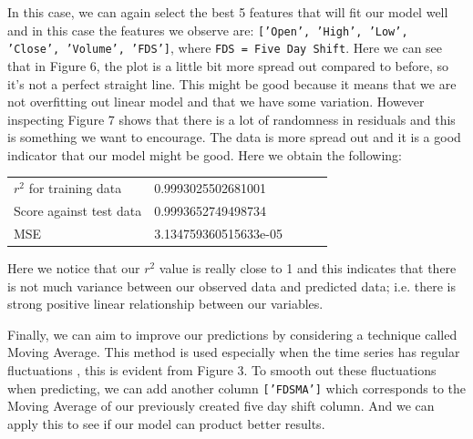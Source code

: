 \documentclass[11pt]{report}
\begin{document}
\vspace{0.3cm}
\noindent
In this case, we can again select the best 5 features that will fit our model well and in this case the features we observe are: \texttt{['Open', 'High', 'Low', 'Close', 'Volume', 'FDS']}, where \texttt{FDS = Five Day Shift}. Here we can see that in Figure 6, the plot is a little bit more spread out compared to before, so it's not a perfect straight line. This might be good because it means that we are not overfitting out linear model and that we have some variation. However inspecting Figure 7 shows that there is a lot of randomness in residuals and this is something we want to encourage. The data is more spread out and it is a good indicator that our model might be good. Here we obtain the following:

\begin{table}[ht]
\centering
\begin{tabular}{lllll}
$r^2$ for training data & 0.9993025502681001 &  \\
Score against test data & 0.9993652749498734 &  \\
MSE & 3.134759360515633e-05 &  \\
\end{tabular}
\end{table}

\noindent
Here we notice that our $r^2$ value is really close to 1 and this indicates that there is not much variance between our observed data and predicted data; i.e. there is strong positive linear relationship between our variables. 

\vspace{0.3cm}
\noindent
Finally, we can aim to improve our predictions by considering a technique called Moving Average. This method is used especially when the time series has regular fluctuations \cite{sma}, this is evident from Figure 3. To smooth out these fluctuations when predicting, we can add another column \texttt{['FDSMA']} which corresponds to the Moving Average of our previously created five day shift column. And we can apply this to see if our model can product better results.
\end{document}
